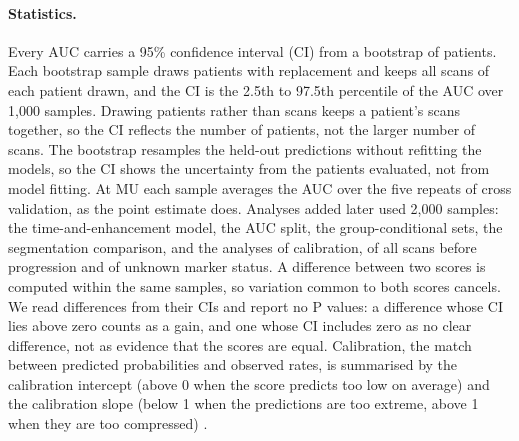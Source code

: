 \paragraph*{Statistics.} Every AUC carries a 95\% confidence interval (CI) from a bootstrap of patients. Each bootstrap
sample draws patients with replacement and keeps all scans of each patient drawn, and the CI is the 2.5th to 97.5th
percentile of the AUC over 1,000 samples. Drawing patients rather than scans keeps a patient's scans together, so the
CI reflects the number of patients, not the larger number of scans. The bootstrap resamples the held-out predictions
without refitting the models, so the CI shows the uncertainty from the patients evaluated, not from model fitting. At
MU each sample averages the AUC over the five repeats of cross validation, as the point estimate does. Analyses added
later used 2,000 samples: the time-and-enhancement model, the AUC split, the group-conditional sets, the segmentation
comparison, and the analyses of calibration, of all scans before progression and of unknown marker status. A
difference between two scores is computed within the same samples, so variation common to both scores cancels. We
read differences from their CIs and report no P values: a difference whose CI lies above zero counts as a gain, and
one whose CI includes zero as no clear difference, not as evidence that the scores are equal. Calibration, the match
between predicted probabilities and observed rates, is summarised by the calibration intercept (above 0 when the
score predicts too low on average) and the calibration slope (below 1 when the predictions are too extreme, above 1
when they are too compressed) \citep{vancalster2019}.

